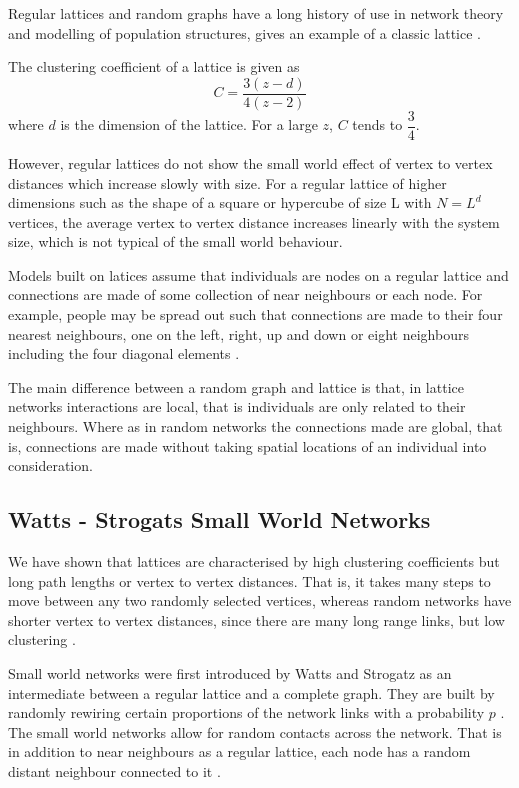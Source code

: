 Regular lattices and random graphs have a long history of use in network theory and modelling of population structures, \cite{harris1974contact} gives an example of a classic lattice .

The clustering coefficient of a lattice is given as  
\begin{equation}
C = \frac{3(z - d)}{4(z -2)}
\end{equation}
where $d$ is the dimension of the lattice. For a large $z$, $C$ tends to $\dfrac{3}{4}$.

However, regular lattices do not show the small world effect of vertex to vertex distances which increase slowly with size. For a regular lattice of higher dimensions such as the shape of a square or hypercube of size L with $N = L^d$ vertices, the average vertex to vertex distance increases linearly with the system size, which is not typical of the small world behaviour.  


Models built on latices assume that individuals are  nodes on a regular lattice and connections are made of some collection of near neighbours or each node. For example, people may be spread out such that connections are made to their four nearest neighbours, one on the left, right, up and down or  eight neighbours including the four diagonal elements  \citep{lloyd2006infection}.

The main difference between a random graph and lattice is that, in lattice networks interactions are local, that is individuals are only related to their neighbours. Where as in random networks the connections  made are global, that is, connections are made without taking spatial locations of an individual into consideration. 

\subsection{Watts - Strogats Small World Networks}
We have shown that lattices are characterised by high clustering coefficients but long path lengths or vertex to vertex distances. That is, it takes many steps to move between any two randomly selected vertices, whereas random networks have shorter vertex to vertex distances, since there are many long range links, but low clustering \citep{keeling2005networks}.


Small world networks were first introduced by Watts and Strogatz as an intermediate between a regular lattice and a complete graph. They are built by randomly rewiring certain proportions of the network links with a probability $p$ \citep{watts1998collective}. The small world networks allow for random contacts across the network. That is in addition to near neighbours as a regular lattice, each node has a random distant neighbour connected to it \citep{watts1998collective}.


